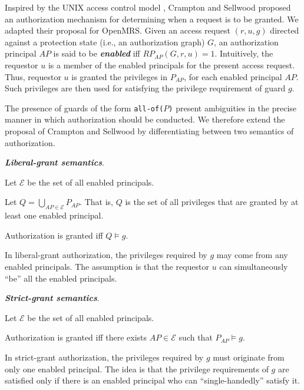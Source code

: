 \documentclass{acm_proc_article-sp}
\newcommand{\Dfn}[1]{\textbf{\emph{#1}}}
\newcommand{\textcode}[1]{\texttt{#1}}
\begin{document}
Inspired by the UNIX access control model \cite{Crampton:2008},
Crampton and Sellwood proposed an authorization mechanism for
determining when a request is to be granted. We adapted their proposal
for OpenMRS.  Given an access request $(r, u, g)$ directed against a
protection state (i.e., an authorization graph) $G$, an authorization
principal $\mathit{AP}$ is said to be \Dfn{enabled} iff
$\mathit{RP}_{\mathit{AP}}(G, r, u) = 1$.  Intuitively, the requestor
$u$ is a member of the enabled principals for the present access
request.  Thus, requestor $u$ is granted the privileges in
$\mathit{P}_{\mathit{AP}}$, for each enabled principal $\mathit{AP}$.
Such privileges are then used for satisfying the privilege requirement
of guard $g$.

The presence of guards of the form \textcode{all-of($P$)} present
ambiguities in the precise manner in which authorization should be
conducted.  We therefore extend the proposal of Crampton and Sellwood
by differentiating between two semantics of authorization.
\begin{compactenum}
\item \Dfn{Liberal-grant semantics}.  
\begin{compactitem}
\item Let $\mathcal{E}$ be the set of all enabled principals.
\item Let $Q = \bigcup_{\mathit{AP} \in \mathcal{E}} P_{\mathit{AP}}$.
  That is, $Q$ is the set of all privileges that are granted by at
  least one enabled principal.
\item Authorization is granted iff $Q \models g$.
\end{compactitem}
In liberal-grant authorization, the privileges required by $g$
may come from any enabled principals.  The assumption is that
the requestor $u$ can simultaneously ``be'' all the enabled
principals.
\item \Dfn{Strict-grant semantics}.
\begin{compactitem}
\item Let $\mathcal{E}$ be the set of all enabled principals.
\item Authorization is granted iff there exists $\mathit{AP} \in
  \mathcal{E}$ such that $P_\mathit{AP} \models g$.
\end{compactitem}
In strict-grant authorization, the privileges required by $g$ must
originate from only one enabled principal.  The idea is that the
privilege requirements of $g$ are satisfied only if there is an
enabled principal who can ``single-handedly'' satisfy it.
\end{compactenum}
\end{document}
